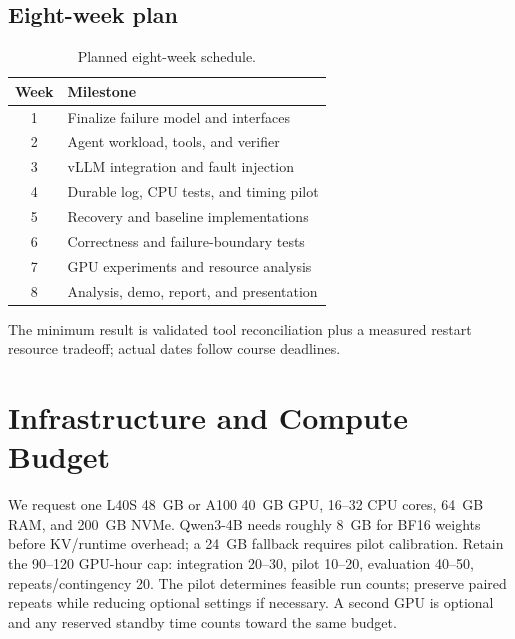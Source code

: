 \documentclass{article}
\begin{document}
\subsection{Eight-week plan}
\begin{table}[ht]
\caption{Planned eight-week schedule.}
\label{tab:timeline}
\vskip 0.10in
\centering
\small
\begin{tabular}{cl}
\toprule
Week & Milestone \\
\midrule
1 & Finalize failure model and interfaces \\
2 & Agent workload, tools, and verifier \\
3 & vLLM integration and fault injection \\
4 & Durable log, CPU tests, and timing pilot \\
5 & Recovery and baseline implementations \\
6 & Correctness and failure-boundary tests \\
7 & GPU experiments and resource analysis \\
8 & Analysis, demo, report, and presentation \\
\bottomrule
\end{tabular}
\vskip -0.05in
\end{table}
The minimum result is validated tool reconciliation plus a measured restart resource tradeoff; actual dates follow course deadlines.


\section{Infrastructure and Compute Budget}
We request one L40S 48~GB or A100 40~GB GPU, 16--32 CPU cores, 64~GB RAM, and 200~GB NVMe. Qwen3-4B needs roughly 8~GB for BF16 weights before KV/runtime overhead; a 24~GB fallback requires pilot calibration. Retain the 90--120 GPU-hour cap: integration 20--30, pilot 10--20, evaluation 40--50, repeats/contingency 20. The pilot determines feasible run counts; preserve paired repeats while reducing optional settings if necessary. A second GPU is optional and any reserved standby time counts toward the same budget.

\clearpage


\end{document}
